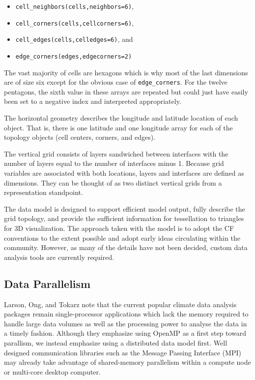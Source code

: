 \begin{itemize}
\item \verb+cell_neighbors(cells,neighbors=6)+,
\item \verb+cell_corners(cells,cellcorners=6)+,
\item \verb+cell_edges(cells,celledges=6)+, and
\item \verb+edge_corners(edges,edgecorners=2)+
\end{itemize}

The vast majority of cells are hexagons which is why most of the last
dimensions are of size six except for the obvious case of \verb+edge_corners+.
For the twelve pentagons, the sixth value in these arrays are repeated but
could just have easily been set to a negative index and interpreted
appropriately.

The horizontal geometry describes the longitude and latitude location of each
object.  That is, there is one latitude and one longitude array for each of
the topology objects (cell centers, corners, and edges).

The vertical grid consists of layers sandwiched between interfaces with the
number of layers equal to the number of interfaces minus 1.   Because grid
variables are associated with both locations, layers and interfaces are
defined as dimensions.  They can be thought of as two distinct vertical grids
from a representation standpoint.

The data model is designed to support efficient model output, fully describe
the grid topology, and provide the sufficient information for tessellation to
triangles for 3D visualization.  The approach taken with the model is to adopt
the CF conventions to the extent possible and adopt early ideas circulating
within the community.  However, as many of the details have not been decided,
custom data analysis tools are currently required.

\subsection{Data Parallelism}

Larson, Ong, and Tokarz note that the current popular climate data analysis
packages remain single-processor applications which lack the memory required
to handle large data volumes as well as the processing power to analyse the
data in a timely fashion\cite{MODSIM07:LOT}.  Although they emphasize using
OpenMP as a first step toward parallism, we instead emphasize using a
distributed data model first.  Well designed communication libraries such as
the Message Passing Interface (MPI)\cite{MPI} may already take advantage of
shared-memory parallelism within a compute node or multi-core desktop
computer.

